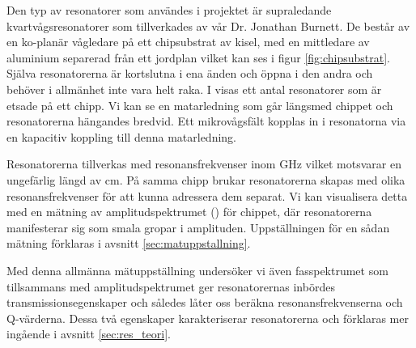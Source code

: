 \documentclass[main.tex]{subfiles}
\begin{document}
Den typ av resonatorer som användes i projektet är supraledande kvartvågsresonatorer som tillverkades av vår Dr. Jonathan Burnett. De består av en ko-planär vågledare på ett chipsubstrat av kisel, med en mittledare av aluminium separerad från ett jordplan \cite{Boehme2016} vilket kan ses i figur \ref{fig:chipsubstrat}. Själva resonatorerna är kortslutna i ena änden och öppna i den andra och behöver i allmänhet inte vara helt raka. I  visas ett antal resonatorer som är etsade på ett chipp. Vi kan se en matarledning som går längsmed chippet och resonatorerna hängandes bredvid. Ett mikrovågsfält kopplas in i resonatorna via en kapacitiv koppling till denna matarledning.

Resonatorerna tillverkas med resonansfrekvenser inom \unit[4-8]{GHz} vilket motsvarar en ungefärlig längd av \unit[1-2]{cm}. På samma chipp brukar resonatorerna skapas med olika resonansfrekvenser för att kunna adressera dem separat. Vi kan visualisera detta med en mätning av amplitudspektrumet () för chippet, där resonatorerna manifesterar sig som smala gropar i amplituden. Uppställningen för en sådan mätning förklaras i avsnitt \ref{sec:matuppstallning}.


Med denna allmänna mätuppställning undersöker vi även fasspektrumet som tillsammans med amplitudspektrumet ger resonatorernas inbördes transmissionsegenskaper och således låter oss beräkna resonansfrekvenserna och Q-värderna. Dessa två egenskaper karakteriserar resonatorerna och förklaras mer ingående i avsnitt \ref{sec:res_teori}.
\end{document}
